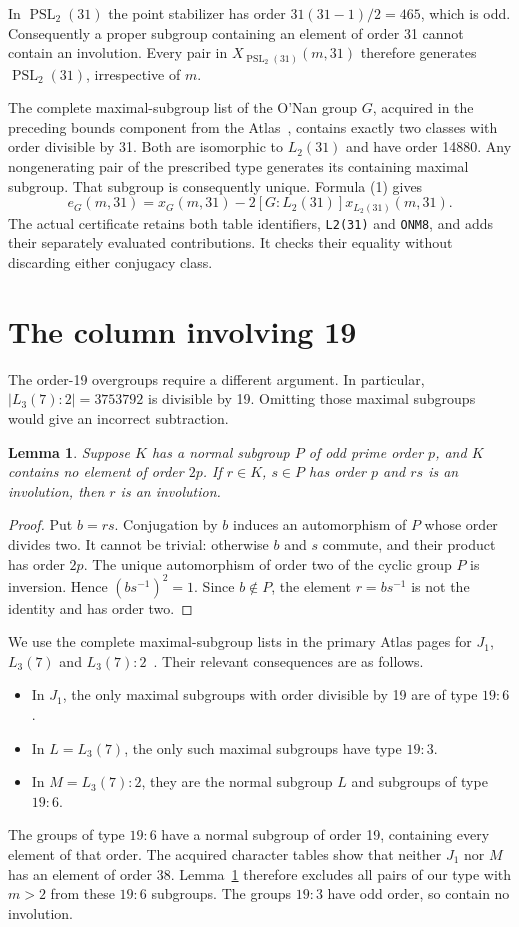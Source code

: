 \documentclass[11pt,a4paper]{article}
\newtheorem{lemma}[theorem]{Lemma}
\newcommand{\PSL}{\operatorname{PSL}}
\begin{document}
In $\PSL_2(31)$ the point stabilizer has order
$31(31-1)/2=465$, which is odd. Consequently a proper subgroup
containing an element of order 31 cannot contain an involution.
Every pair in $X_{\PSL_2(31)}(m,31)$ therefore generates
$\PSL_2(31)$, irrespective of $m$.

The complete maximal-subgroup list of the O'Nan group $G$, acquired in
the preceding bounds component from the Atlas~\cite{AtlasON}, contains
exactly two classes with order divisible by 31. Both are isomorphic
to $L_2(31)$ and have order 14880. Any nongenerating pair of the
prescribed type generates its containing maximal subgroup. That
subgroup is consequently unique. Formula (1) gives
\[
 e_G(m,31)=x_G(m,31)-2[G:L_2(31)]x_{L_2(31)}(m,31). \tag{2}
\]
The actual certificate retains both table identifiers, \texttt{L2(31)}
and \texttt{ONM8}, and adds their separately evaluated contributions.
It checks their equality without discarding either conjugacy class.

\section{The column involving 19}
The order-19 overgroups require a different argument. In particular,
$|L_3(7):2|=3753792$ is divisible by 19. Omitting those maximal
subgroups would give an incorrect subtraction.

\begin{lemma}\label{cyclic}
Suppose $K$ has a normal subgroup $P$ of odd prime order $p$, and
$K$ contains no element of order $2p$. If $r\in K$, $s\in P$ has order $p$
and $rs$ is an involution, then $r$ is an involution.
\end{lemma}
\begin{proof}
Put $b=rs$. Conjugation by $b$ induces an automorphism of $P$ whose
order divides two. It cannot be trivial: otherwise $b$ and $s$ commute,
and their product has order $2p$. The unique automorphism of order two
of the cyclic group $P$ is inversion. Hence
$(bs^{-1})^2=1$. Since $b\notin P$, the element $r=bs^{-1}$ is not
the identity and has order two.
\end{proof}

We use the complete maximal-subgroup lists in the primary Atlas pages
for $J_1$, $L_3(7)$ and $L_3(7):2$~\cite{AtlasJ1,AtlasL37}.
Their relevant consequences are as follows.
\begin{itemize}
\item In $J_1$, the only maximal subgroups with order divisible by 19
are of type $19:6$.
\item In $L=L_3(7)$, the only such maximal subgroups have type $19:3$.
\item In $M=L_3(7):2$, they are the normal subgroup $L$ and subgroups
of type $19:6$.
\end{itemize}
The groups of type $19:6$ have a normal subgroup of order 19, containing
every element of that order. The acquired character tables show that
neither $J_1$ nor $M$ has an element of order 38. Lemma~\ref{cyclic}
therefore excludes all pairs of our type with $m>2$ from these $19:6$
subgroups. The groups $19:3$ have odd order, so contain no involution.
\end{document}
